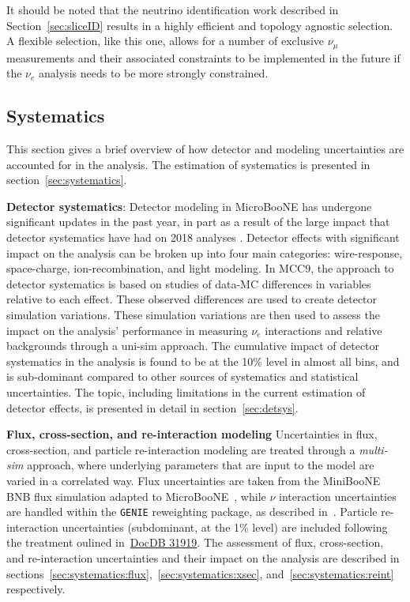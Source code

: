 It should be noted that the neutrino identification work described in Section~\ref{sec:sliceID} results in a highly efficient and topology agnostic selection. A flexible selection, like this one, allows for a number of exclusive $\nu_{\mu}$ measurements and their associated constraints to be implemented in the future if the $\nu_e$ analysis needs to be more strongly constrained. 

\subsection{Systematics}
\par This section gives a brief overview of how detector and modeling uncertainties are accounted for in the analysis. The estimation of systematics is presented in section~\ref{sec:systematics}.
\par \noindent \textbf{Detector systematics}: Detector modeling in MicroBooNE has undergone significant updates in the past year, in part as a result of the large impact that detector systematics have had on 2018 analyses \cite{bib:CCpi0, bib:CCincl}. Detector effects with significant impact on the analysis can be broken up into four main categories: wire-response, space-charge, ion-recombination, and light modeling. In MCC9, the approach to detector systematics is based on studies of data-MC differences in variables relative to each effect. These observed differences are used to create detector simulation variations. These simulation variations are then used to assess the impact on the analysis' performance in measuring $\nu_e$ interactions and relative backgrounds through a uni-sim approach. The cumulative impact of detector systematics in the analysis is found to be at the 10\% level in almost all bins, and is sub-dominant compared to other sources of systematics and statistical uncertainties. The topic, including limitations in the current estimation of detector effects, is presented in detail in section~\ref{sec:detsys}.
\par \noindent \textbf{Flux, cross-section, and re-interaction modeling} Uncertainties in flux, cross-section, and particle re-interaction modeling are treated through a \emph{multi-sim} approach, where underlying parameters that are input to the model are varied in a correlated way. Flux uncertainties are taken from the MiniBooNE BNB flux simulation adapted to MicroBooNE~\cite{bib:fluxmcc9,bib:fluxtechnote}, while $\nu$ interaction uncertainties are handled within the \texttt{GENIE} reweighting package, as described in~\cite{bib:geniesupportnote}. Particle re-interaction uncertainties (subdominant, at the 1\% level) are included following the treatment oulined in~\href{https://microboone-docdb.fnal.gov/cgi-bin/private/ShowDocument?docid=31919}{DocDB 31919}. The assessment of flux, cross-section, and re-interaction uncertainties and their impact on the analysis are described in sections~\cref{sec:systematics:flux},~\cref{sec:systematics:xsec}, and~\cref{sec:systematics:reint} respectively.

